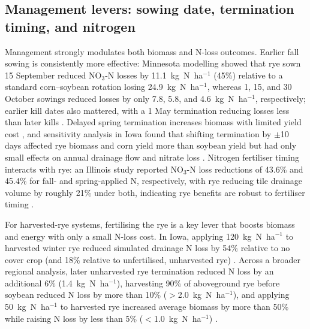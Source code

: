 \subsection{Management levers: sowing date, termination timing, and nitrogen}
Management strongly modulates both biomass and N-loss outcomes. Earlier fall sowing is consistently more effective: Minnesota modelling showed that rye sown 15 September reduced NO$_3$-N losses by 11.1~kg~N~ha$^{-1}$ (45\%) relative to a standard corn--soybean rotation losing 24.9~kg~N~ha$^{-1}$, whereas 1, 15, and 30 October sowings reduced losses by only 7.8, 5.8, and 4.6~kg~N~ha$^{-1}$, respectively; earlier kill dates also mattered, with a 1 May termination reducing losses less than later kills \parencite{Feyereisen2006b}. Delayed spring termination increases biomass with limited yield cost \parencite{Birru2023}, and sensitivity analysis in Iowa found that shifting termination by $\pm$10 days affected rye biomass and corn yield more than soybean yield but had only small effects on annual drainage flow and nitrate loss \parencite{Chatterjee2025}. Nitrogen fertiliser timing interacts with rye: an Illinois study reported NO$_3$-N loss reductions of 43.6\% and 45.4\% for fall- and spring-applied N, respectively, with rye reducing tile drainage volume by roughly 21\% under both, indicating rye benefits are robust to fertiliser timing \parencite{Gupta2022}.

For harvested-rye systems, fertilising the rye is a key lever that boosts biomass and energy with only a small N-loss cost. In Iowa, applying 120~kg~N~ha$^{-1}$ to harvested winter rye reduced simulated drainage N loss by 54\% relative to no cover crop (and 18\% relative to unfertilised, unharvested rye) \parencite{Malone2018}. Across a broader regional analysis, later unharvested rye termination reduced N loss by an additional 6\% (1.4~kg~N~ha$^{-1}$), harvesting 90\% of aboveground rye before soybean reduced N loss by more than 10\% ($>$2.0~kg~N~ha$^{-1}$), and applying 50~kg~N~ha$^{-1}$ to harvested rye increased average biomass by more than 50\% while raising N loss by less than 5\% ($<$1.0~kg~N~ha$^{-1}$) \parencite{Malone2023}.

